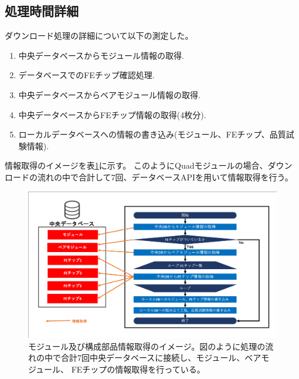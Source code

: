 \subsection{処理時間詳細}
ダウンロード処理の詳細について以下の測定した。
\begin{enumerate}
  \item 中央データベースからモジュール情報の取得.
  \item データベースでのFEチップ確認処理.
  \item 中央データベースからベアモジュール情報の取得.
  \item 中央データベースからFEチップ情報の取得(4枚分).
  \item ローカルデータベースへの情報の書き込み(モジュール、FEチップ、品質試験情報).
\end{enumerate}

情報取得のイメージを表\ref{download_process_image}に示す。
このようにQuadモジュールの場合、ダウンロードの流れの中で合計して7回、データベースAPIを用いて情報取得を行う。
\begin{figure}[bpt]\centering
\includegraphics[width=15cm]{download_process_image}
\caption[モジュール及び構成部品情報取得のイメージ図]{モジュール及び構成部品情報取得のイメージ。図のように処理の流れの中で合計7回中央データベースに接続し、モジュール、ベアモジュール、 FEチップの情報取得を行っている。}
\label{download_process_image}
\end{figure}

